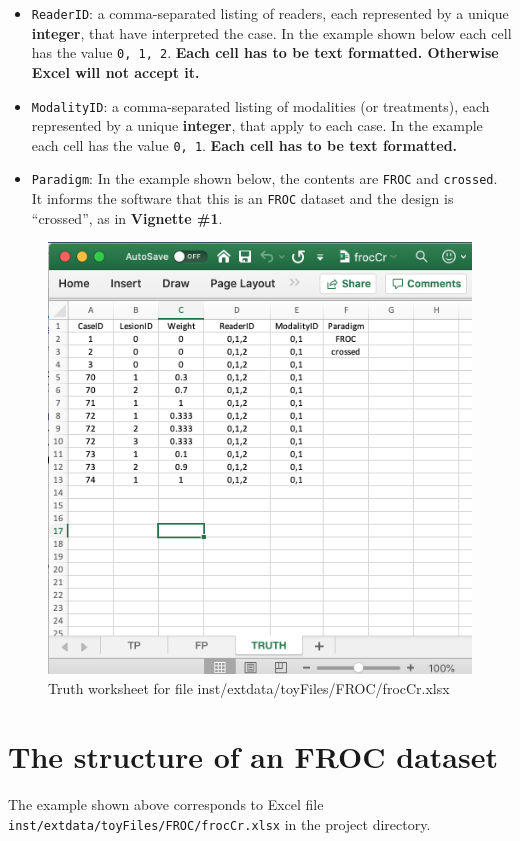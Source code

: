 \documentclass[
]{book}
\begin{document}
\begin{itemize}
\item
  \texttt{ReaderID}: a comma-separated listing of readers, each represented by a unique \textbf{integer}, that have interpreted the case. In the example shown below each cell has the value \texttt{0,\ 1,\ 2}. \textbf{Each cell has to be text formatted. Otherwise Excel will not accept it.}
\item
  \texttt{ModalityID}: a comma-separated listing of modalities (or treatments), each represented by a unique \textbf{integer}, that apply to each case. In the example each cell has the value \texttt{0,\ 1}. \textbf{Each cell has to be text formatted.}
\item
  \texttt{Paradigm}: In the example shown below, the contents are \texttt{FROC} and \texttt{crossed}. It informs the software that this is an \texttt{FROC} dataset and the design is ``crossed'', as in \textbf{Vignette \#1}.
\end{itemize}

\begin{figure}

{\centering \includegraphics[width=0.5\linewidth,height=0.2\textheight]{images/frocCrTruth} 

}

\caption{Truth worksheet for file inst/extdata/toyFiles/FROC/frocCr.xlsx}\label{fig:frocCrTruth}
\end{figure}

\hypertarget{the-structure-of-an-froc-dataset}{%
\section{The structure of an FROC dataset}\label{the-structure-of-an-froc-dataset}}

The example shown above corresponds to Excel file \texttt{inst/extdata/toyFiles/FROC/frocCr.xlsx} in the project directory.
\end{document}
